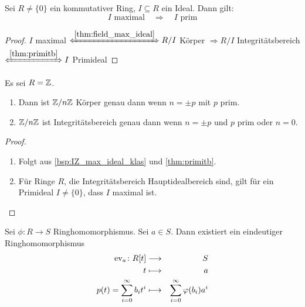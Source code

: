\documentclass[12pt,a4paper]{scrartcl}
\begin{document}
\begin{kor} \label{cor:maxprim}
	Sei $R\neq\{0\}$ ein kommutativer Ring, $I\subseteq R$ ein Ideal. Dann gilt: \[\text{$I$ maximal} \quad  \Longrightarrow \quad  \text{$I $ prim} \]
\end{kor}
\begin{proof}
	$I$ maximal $\xLeftrightarrow{\ref{thm:field_max_ideal}}  R/I$ Körper $\Rightarrow R/I$ Integritätsbereich $\xLeftrightarrow{\ref{thm:primitb}} I$ Primideal
\end{proof}


\begin{kor} \label{cor:IZ_quotring_klas}
	Es sei $R=\mathbb Z$.
	\begin{enumerate}
	\item Dann ist $\mathbb Z/n\mathbb Z$ Körper genau dann wenn $n = \pm p$ mit $p$ prim.
	\item  $\mathbb Z/n\mathbb Z$ ist Integritätsbereich genau dann wenn $n = \pm p$ und $p$ prim oder $n = 0$.
	\end{enumerate}
\end{kor}

\begin{proof}
	\leavevmode
	\begin{enumerate}
		\item Folgt aus \cref{bsp:IZ_max_ideal_klas} und \cref{thm:primitb}.
		\item Für Ringe $R$, die Integritätsbereich Hauptidealbereich sind, gilt für ein Primideal $I \neq \{0\}$, dass $I $ maximal ist.
		\end{enumerate}
\end{proof}	
	
\begin{satz}\label{thm:unieig_polyring}
	Sei $\phi\colon R\to S$ Ringhomomorphismus. Sei $a\in S$. Dann existiert ein eindeutiger Ringhomomorphismus
	\begin{eqnarray*}
		\operatorname{ev}_a\colon R[t] & \longrightarrow & S\\
		t & \longmapsto & a\\
		p(t )= \sum_{i = 0}^{\infty}b_it^i & \longmapsto& \sum_{i = 0}^{\infty} \varphi(b_i)a^i
	\end{eqnarray*}
	
\end{satz}
\end{document}
